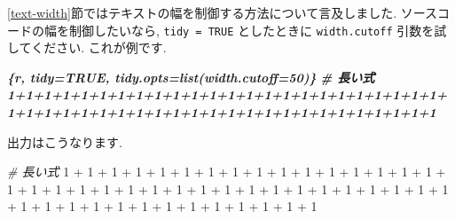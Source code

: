 \documentclass[
  11pt,
  lualatex,
  ja=standard]{bxjsreport}
\newenvironment{Shaded}{\begin{snugshade}}{\end{snugshade}}
\newcommand{\CommentTok}[1]{\textcolor[rgb]{0.56,0.35,0.01}{\textit{#1}}}
\newcommand{\DecValTok}[1]{\textcolor[rgb]{0.00,0.00,0.81}{#1}}
\newcommand{\InformationTok}[1]{\textcolor[rgb]{0.56,0.35,0.01}{\textbf{\textit{#1}}}}
\newcommand{\SpecialCharTok}[1]{\textcolor[rgb]{0.00,0.00,0.00}{#1}}
\begin{document}
\ref{text-width}節ではテキストの幅を制御する方法について言及しました. ソースコードの幅を制御したいなら, \texttt{tidy = TRUE} としたときに \texttt{width.cutoff} 引数を試してください. これが例です.

\begin{Shaded}
\begin{Highlighting}[]
\InformationTok{\textasciigrave{}\textasciigrave{}\textasciigrave{}\{r, tidy=TRUE, tidy.opts=list(width.cutoff=50)\}}
\InformationTok{\# 長い式}
\InformationTok{1+1+1+1+1+1+1+1+1+1+1+1+1+1+1+1+1+1+1+1+1+1+1+1+}
\InformationTok{1+1+1+1+1+1+1+1+1+1+1+1+1+1+1+1+1+1+1+1+1+1+1+1}
\InformationTok{\textasciigrave{}\textasciigrave{}\textasciigrave{}}
\end{Highlighting}
\end{Shaded}

出力はこうなります.

\begin{Shaded}
\begin{Highlighting}[numbers=left,,]
\CommentTok{\# 長い式}
\DecValTok{1} \SpecialCharTok{+} \DecValTok{1} \SpecialCharTok{+} \DecValTok{1} \SpecialCharTok{+} \DecValTok{1} \SpecialCharTok{+} \DecValTok{1} \SpecialCharTok{+} \DecValTok{1} \SpecialCharTok{+} \DecValTok{1} \SpecialCharTok{+} \DecValTok{1} \SpecialCharTok{+} \DecValTok{1} \SpecialCharTok{+} \DecValTok{1} \SpecialCharTok{+} \DecValTok{1} \SpecialCharTok{+} \DecValTok{1} \SpecialCharTok{+} \DecValTok{1} \SpecialCharTok{+} 
  \DecValTok{1} \SpecialCharTok{+} \DecValTok{1} \SpecialCharTok{+} \DecValTok{1} \SpecialCharTok{+} \DecValTok{1} \SpecialCharTok{+} \DecValTok{1} \SpecialCharTok{+} \DecValTok{1} \SpecialCharTok{+} \DecValTok{1} \SpecialCharTok{+} \DecValTok{1} \SpecialCharTok{+} \DecValTok{1} \SpecialCharTok{+} \DecValTok{1} \SpecialCharTok{+} \DecValTok{1} \SpecialCharTok{+} \DecValTok{1} \SpecialCharTok{+} 
  \DecValTok{1} \SpecialCharTok{+} \DecValTok{1} \SpecialCharTok{+} \DecValTok{1} \SpecialCharTok{+} \DecValTok{1} \SpecialCharTok{+} \DecValTok{1} \SpecialCharTok{+} \DecValTok{1} \SpecialCharTok{+} \DecValTok{1} \SpecialCharTok{+} \DecValTok{1} \SpecialCharTok{+} \DecValTok{1} \SpecialCharTok{+} \DecValTok{1} \SpecialCharTok{+} \DecValTok{1} \SpecialCharTok{+} \DecValTok{1} \SpecialCharTok{+} 
  \DecValTok{1} \SpecialCharTok{+} \DecValTok{1} \SpecialCharTok{+} \DecValTok{1} \SpecialCharTok{+} \DecValTok{1} \SpecialCharTok{+} \DecValTok{1} \SpecialCharTok{+} \DecValTok{1} \SpecialCharTok{+} \DecValTok{1} \SpecialCharTok{+} \DecValTok{1} \SpecialCharTok{+} \DecValTok{1} \SpecialCharTok{+} \DecValTok{1} \SpecialCharTok{+} \DecValTok{1}
\end{Highlighting}
\end{Shaded}
\end{document}
